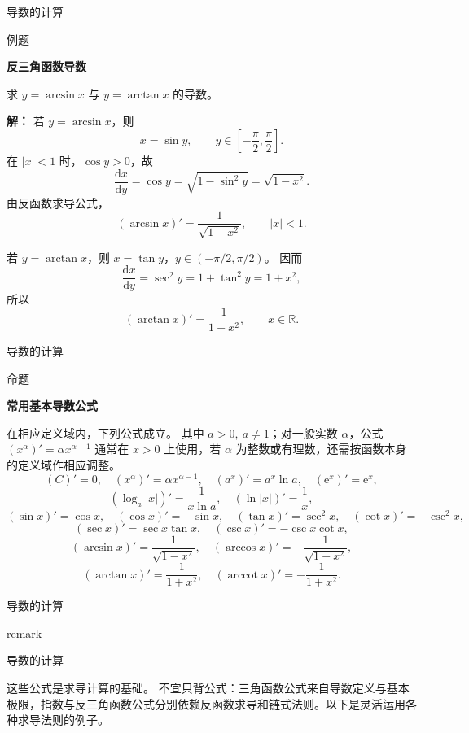 \documentclass[aspectratio=169,10pt,fontset=fandol]{ctexbeamer}
\newcommand{\dd}{\mathrm{d}}
\newcommand{\ee}{\mathrm{e}}
\newcommand{\RR}{\mathbb{R}}
\begin{document}
\begin{frame}[t,fragile]{导数的计算}
\footnotesize
\begin{block}{例题}
{\footnotesize
\textbf{反三角函数导数}\par

求 $y=\arcsin x$ 与 $y=\arctan x$ 的导数。

}
\end{block}
\pause
{\footnotesize
\textbf{解：}
若 $y=\arcsin x$，则
\[
x=\sin y,\qquad y\in\left[-\frac{\pi}{2},\frac{\pi}{2}\right].
\]
在 $|x|<1$ 时，$\cos y>0$，故
\[
\frac{\dd x}{\dd y}=\cos y=\sqrt{1-\sin^2y}=\sqrt{1-x^2}.
\]
由反函数求导公式，
\[
(\arcsin x)'=\frac{1}{\sqrt{1-x^2}},\qquad |x|<1.
\]

若 $y=\arctan x$，则 $x=\tan y$，$y\in(-\pi/2,\pi/2)$。 因而
\[
\frac{\dd x}{\dd y}=\sec^2y=1+\tan^2y=1+x^2,
\]
所以
\[
(\arctan x)'=\frac1{1+x^2},\qquad x\in\RR.
\]

}
\end{frame}
\begin{frame}[t,fragile]{导数的计算}
\footnotesize
\begin{block}{命题}
{\footnotesize
\textbf{常用基本导数公式}\par

	在相应定义域内，下列公式成立。 其中 $a>0,\ a\neq1$；对一般实数 $\alpha$，公式 $(x^\alpha)'=\alpha x^{\alpha-1}$ 通常在 $x>0$ 上使用，若 $\alpha$ 为整数或有理数，还需按函数本身的定义域作相应调整。
	\[
	(C)'=0,\quad (x^\alpha)'=\alpha x^{\alpha-1},\quad (a^x)'=a^x\ln a,\quad (\ee^x)'=\ee^x,
	\]
	\[
	(\log_a |x|)'=\frac1{x\ln a},\quad (\ln |x|)'=\frac1x,
	\]
	\[
	(\sin x)'=\cos x,\quad (\cos x)'=-\sin x,\quad
	(\tan x)'=\sec^2x,\quad (\cot x)'=-\csc^2x,
	\]
	\[
	(\sec x)'=\sec x\tan x,\quad (\csc x)'=-\csc x\cot x,
	\]
	\[
	(\arcsin x)'=\frac1{\sqrt{1-x^2}},\quad
	(\arccos x)'=-\frac1{\sqrt{1-x^2}},
	\]
	\[
	(\arctan x)'=\frac1{1+x^2},\quad
	(\operatorname{arccot}x)'=-\frac1{1+x^2}.
	\]

}
\end{block}
\end{frame}
\begin{frame}[t,fragile]{导数的计算}
\normalsize
{\normalsize
remark

}
\end{frame}
\begin{frame}[t,fragile]{导数的计算}
\normalsize
{\normalsize
这些公式是求导计算的基础。 不宜只背公式：三角函数公式来自导数定义与基本极限，指数与反三角函数公式分别依赖反函数求导和链式法则。以下是灵活运用各种求导法则的例子。

}
\end{frame}
\end{document}
